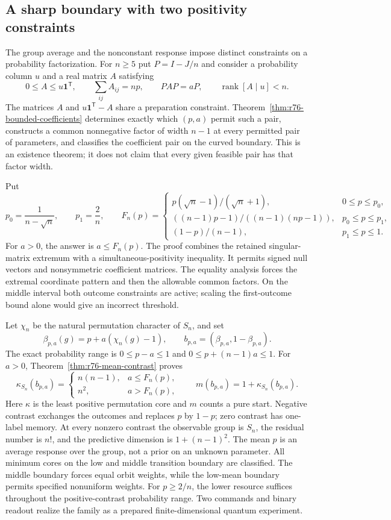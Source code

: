 \subsection*{A sharp boundary with two positivity constraints}

The group average and the nonconstant response impose distinct
constraints on a probability factorization. For $n\ge5$ put $P=I-J/n$
and consider a probability column $u$ and a real matrix $A$ satisfying
\[
 0\le A\le u\mathbf1^{\mathsf T},\qquad
 \sum_{ij}A_{ij}=np,\qquad PAP=aP,\qquad
 \operatorname{rank}[A\mid u]<n.
\]
The matrices $A$ and $u\mathbf1^{\mathsf T}-A$ share a preparation
constraint. Theorem~\ref{thm:r76-bounded-coefficients} determines exactly
which $(p,a)$ permit such a pair, constructs a common nonnegative factor
of width $n-1$ at every permitted pair of parameters, and classifies the
coefficient pair on the curved boundary. This is an existence theorem;
it does not claim that every given feasible pair has that factor width.

Put
\[
 p_0=\frac1{n-\sqrt n},\qquad p_1=\frac2n,\qquad
 F_n(p)=\begin{cases}
 p(\sqrt n-1)/(\sqrt n+1),&0\le p\le p_0,\\
 ((n-1)p-1)/((n-1)(np-1)),&p_0\le p\le p_1,\\
 (1-p)/(n-1),&p_1\le p\le1.
 \end{cases}
\]
For $a>0$, the answer is $a\le F_n(p)$. The proof combines the retained
singular-matrix extremum with a simultaneous-positivity inequality.
It permits signed null vectors and nonsymmetric coefficient matrices.
The equality analysis forces the extremal coordinate pattern and then
the allowable common factors. On the middle interval both outcome
constraints are active; scaling the first-outcome bound alone would
give an incorrect threshold.

Let $\chi_n$ be the natural permutation character of $S_n$, and set
\[
 \beta_{p,a}(g)=p+a(\chi_n(g)-1),\qquad
 b_{p,a}=(\beta_{p,a},1-\beta_{p,a}).
\]
The exact probability range is
$0\le p-a\le1$ and $0\le p+(n-1)a\le1$.
For $a>0$, Theorem~\ref{thm:r76-mean-contrast} proves
\[
 \kappa_{S_n}(b_{p,a})=
 \begin{cases}n(n-1),&a\le F_n(p),\\n^2,&a>F_n(p),\end{cases}
 \qquad m(b_{p,a})=1+\kappa_{S_n}(b_{p,a}).
\]
Here $\kappa$ is the least positive permutation core and $m$ counts a
pure start. Negative contrast exchanges the outcomes and replaces
$p$ by $1-p$; zero contrast has one-label memory. At every nonzero
contrast the observable group is $S_n$, the residual number is $n!$,
and the predictive dimension is $1+(n-1)^2$. The mean $p$ is an
average response over the group, not a prior on an unknown parameter.
All minimum cores on the low and middle transition boundary are
classified. The middle boundary forces equal orbit weights, while
the low-mean boundary permits specified nonuniform weights.
For $p\ge2/n$, the lower resource suffices throughout the positive-contrast
probability range. Two commands and binary readout realize the family
as a prepared finite-dimensional quantum experiment.

